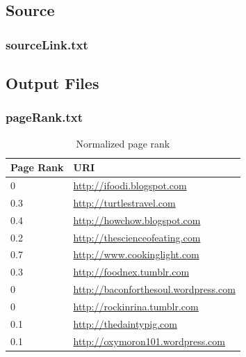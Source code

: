 \documentclass[12pt]{article}
\begin{document}
\subsection{Source}
\subsubsection{sourceLink.txt}


\subsection{Output Files}
\subsubsection{pageRank.txt}

\newpage

\begin{center}
\begin{table}
\small
\begin{tabular}{ | p{4.0cm} | p{12.0cm} | }\hline
\textbf{Page Rank} & \textbf{URI} \\\hline
0   & \url{http://ifoodi.blogspot.com } \\\hline
0.3 & \url{ http://turtlestravel.com} \\\hline
0.4 & \url{ http://howchow.blogspot.com} \\\hline
0.2 & \url{ http://thescienceofeating.com} \\\hline 
0.7 & \url{ http://www.cookinglight.com} \\\hline
0.3 & \url{http://foodnex.tumblr.com} \\\hline
0   & \url{ http://baconforthesoul.wordpress.com} \\\hline
0   & \url{ http://rockinrina.tumblr.com} \\\hline
0.1 & \url{ http://thedaintypig.com} \\\hline
0.1 & \url{ http://oxymoron101.wordpress.com} \\\hline
\end{tabular}
\caption{Normalized page rank}
\end{table}
\end{center}
\end{document}
